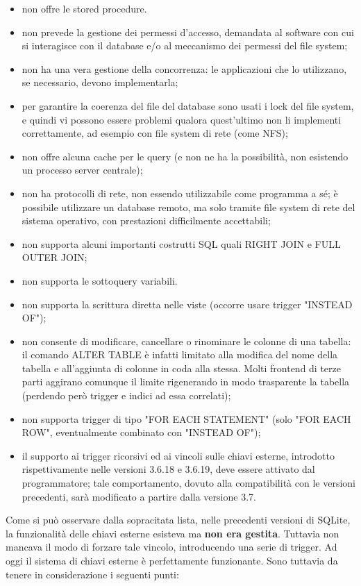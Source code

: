 \documentclass[10pt,a4paper,onecolumn]{article}
\begin{document}
\begin{itemize}
    \item non offre le stored procedure.
    \item non prevede la gestione dei permessi d'accesso, demandata al software con cui si interagisce con il database e/o al meccanismo dei permessi del file system;
    \item non ha una vera gestione della concorrenza: le applicazioni che lo utilizzano, se necessario, devono implementarla;
    \item per garantire la coerenza del file del database sono usati i lock del file system, e quindi vi possono essere problemi qualora quest'ultimo non li implementi correttamente, ad esempio con file system di rete (come NFS);
    \item non offre alcuna cache per le query (e non ne ha la possibilità, non esistendo un processo server centrale);
    \item non ha protocolli di rete, non essendo utilizzabile come programma a sé; è possibile utilizzare un database remoto, ma solo tramite file system di rete del sistema operativo, con prestazioni difficilmente accettabili;
    \item non supporta alcuni importanti costrutti SQL quali RIGHT JOIN e FULL OUTER JOIN;
    \item non supporta le sottoquery variabili.
    \item non supporta la scrittura diretta nelle viste (occorre usare trigger "INSTEAD OF");
    \item non consente di modificare, cancellare o rinominare le colonne di una tabella: il comando ALTER TABLE è infatti limitato alla modifica del nome della tabella e all'aggiunta di colonne in coda alla stessa. Molti frontend di terze parti aggirano comunque il limite rigenerando in modo trasparente la tabella (perdendo però trigger e indici ad essa correlati);
    \item non supporta trigger di tipo "FOR EACH STATEMENT" (solo "FOR EACH ROW", eventualmente combinato con "INSTEAD OF");
    \item il supporto ai trigger ricorsivi ed ai vincoli sulle chiavi esterne, introdotto rispettivamente nelle versioni 3.6.18 e 3.6.19, deve essere attivato dal programmatore; tale comportamento, dovuto alla compatibilità con le versioni precedenti, sarà modificato a partire dalla versione 3.7.
\end{itemize}

Come si può osservare dalla sopracitata lista, nelle precedenti versioni di SQLite, la funzionalità delle chiavi esterne esisteva ma {\bfseries non era gestita}. Tuttavia non mancava il modo di forzare tale vincolo, introducendo una serie di trigger. Ad oggi il sistema di chiavi esterne è perfettamente funzionante. Sono tuttavia da tenere in considerazione i seguenti punti:
\end{document}

